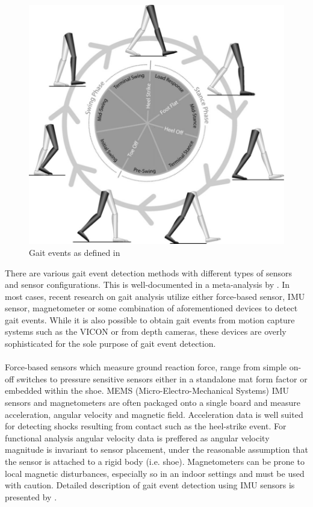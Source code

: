 \begin{figure}[th]
\centering
\includegraphics[width=\textwidth,height=\textheight,keepaspectratio]{Figures/gait_event_whittle.jpg}
\decoRule
\caption[Gait event definition]{Gait events as defined in \cite{Whi06}}
\label{fig:gait_event_whittle}
\end{figure}
\noindent
There are various gait event detection methods with different types of sensors and sensor configurations. This is well-documented in a meta-analysis by \cite{Rue10}. In most cases, recent research on gait analysis utilize either force-based sensor, IMU sensor, magnetometer or some combination of aforementioned devices to detect gait events. While it is also possible to obtain gait events from motion capture systems such as the VICON or from depth cameras, these devices are overly sophisticated for the sole purpose of gait event detection.
\\\\
Force-based sensors which measure ground reaction force, range from simple on-off switches to pressure sensitive sensors either in a standalone mat form factor or embedded within the shoe. MEMS (Micro-Electro-Mechanical Systems) IMU sensors and magnetometers are often packaged onto a single board and measure acceleration, angular velocity and magnetic field. Acceleration data is well suited for detecting shocks resulting from contact such as the heel-strike event. For functional analysis angular velocity data is preffered as angular velocity magnitude is invariant to sensor placement, under the reasonable assumption that the sensor is attached to a rigid body (i.e. shoe). Magnetometers can be prone to local magnetic disturbances, especially so in an indoor settings and must be used with caution. Detailed description of gait event detection using IMU sensors is presented by \cite{Jas06}.
